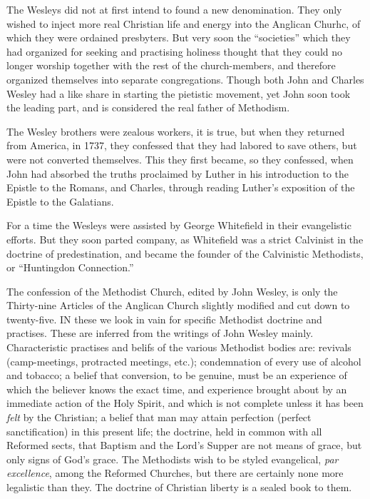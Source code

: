 \documentclass[
]{book}
\begin{document}
The Wesleys did not at first intend to found a new denomination. They only wished to inject more real Christian life and energy into the Anglican Churhc, of which they were ordained presbyters. But very soon the ``societies'' which they had organized for seeking and practising holiness thought that they could no longer worship together with the rest of the church-members, and therefore organized themselves into separate congregations. Though both John and Charles Wesley had a like share in starting the pietistic movement, yet John soon took the leading part, and is considered the real father of Methodism.

The Wesley brothers were zealous workers, it is true, but when they returned from America, in 1737, they confessed that they had labored to save others, but were not converted themselves. This they first became, so they confessed, when John had absorbed the truths proclaimed by Luther in his introduction to the Epistle to the Romans, and Charles, through reading Luther's exposition of the Epistle to the Galatians.

For a time the Wesleys were assisted by George Whitefield in their evangelistic efforts. But they soon parted company, as Whitefield was a strict Calvinist in the doctrine of predestination, and became the founder of the Calvinistic Methodists, or ``Huntingdon Connection.''

The confession of the Methodist Church, edited by John Wesley, is only the Thirty-nine Articles of the Anglican Church slightly modified and cut down to twenty-five. IN these we look in vain for specific Methodist doctrine and practises. These are inferred from the writings of John Wesley mainly. Characteristic practises and belifs of the various Methodist bodies are: revivals (camp-meetings, protracted meetings, etc.); condemnation of every use of alcohol and tobacco; a belief that conversion, to be genuine, must be an experience of which the believer knows the exact time, and experience brought about by an immediate action of the Holy Spirit, and which is not complete unless it has been \emph{felt} by the Christian; a belief that man may attain perfection (perfect sanctification) in this present life; the doctrine, held in common with all Reformed sects, that Baptism and the Lord's Supper are not means of grace, but only signs of God's grace. The Methodists wish to be styled evangelical, \emph{par excellence}, among the Reformed Churches, but there are certainly none more legalistic than they. The doctrine of Christian liberty is a sealed book to them.
\end{document}
